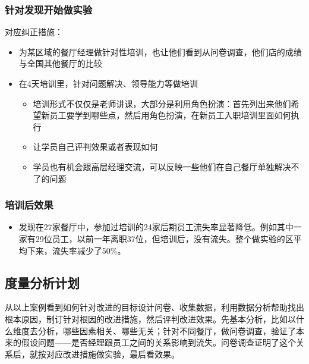 \hypertarget{ux9488ux5bf9ux53d1ux73b0ux5f00ux59cbux505aux5b9eux9a8c}{%
\subsubsection{针对发现开始做实验}\label{ux9488ux5bf9ux53d1ux73b0ux5f00ux59cbux505aux5b9eux9a8c}}

对应纠正措施：

\begin{itemize}
\tightlist
\item
  为某区域的餐厅经理做针对性培训，也让他们看到从问卷调查，他们店的成绩与全国其他餐厅的比较
\item
  在4天培训里，针对问题解决、领导能力等做培训

  \begin{itemize}
  \tightlist
  \item
    培训形式不仅仅是老师讲课，大部分是利用角色扮演：首先列出来他们希望新员工要学到哪些点，然后用角色扮演，在新员工入职培训里面如何执行
  \item
    让学员自己评判效果或者表现如何
  \item
    学员也有机会跟高层经理交流，可以反映一些他们在自己餐厅单独解决不了的问题
  \end{itemize}
\end{itemize}

\hypertarget{ux57f9ux8badux540eux6548ux679c}{%
\subsubsection{培训后效果}\label{ux57f9ux8badux540eux6548ux679c}}

\begin{itemize}
\tightlist
\item
  发现在27家餐厅中，参加过培训的24家后期员工流失率显著降低。例如其中一家有29位员工，以前一年离职37位，但培训后，没有流失。整个做实验的区平均下来，流失率减少了50\%。\\
\end{itemize}

\hypertarget{ux5ea6ux91cfux5206ux6790ux8ba1ux5212}{%
\subsection{度量分析计划}\label{ux5ea6ux91cfux5206ux6790ux8ba1ux5212}}

从以上案例看到如何针对改进的目标设计问卷、收集数据，利用数据分析帮助找出根本原因，制订针对根因的改进措施，然后评判改进效果。先基本分析，比如以什么维度去分析，哪些因素相关、哪些无关；针对不同餐厅，做问卷调查，验证了本来的假设问题------是否经理跟员工之间的关系影响到流失。问卷调查证明了这个关系后，就按对应改进措施做实验，最后看效果。\\

